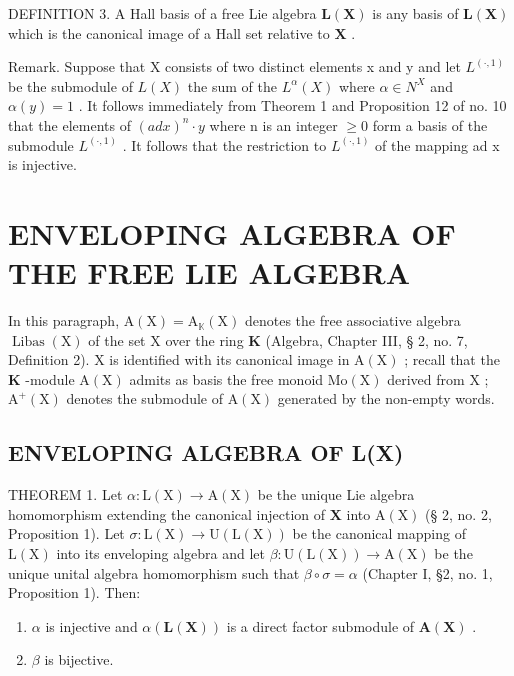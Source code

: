 DEFINITION 3. A Hall basis of a free Lie algebra \(\mathbf{L}(\mathbf{X})\) is any basis of \(\mathbf{L}(\mathbf{X})\) which is the canonical image of a Hall set relative to \(\mathbf{X}\) .

Remark. Suppose that X consists of two distinct elements x and y and let \(L^{(\cdot,1)}\) be the submodule of \(L(X)\) the sum of the \(L^{\alpha}(X)\) where \(\alpha\in N^{X}\) and \(\alpha(y)=1\) . It follows immediately from Theorem 1 and Proposition 12 of no. 10 that the elements of \((ad x)^{n}\cdot y\) where n is an integer \(\geqslant0\) form a basis of the submodule \(L^{(\cdot,1)}\) . It follows that the restriction to \(L^{(\cdot,1)}\) of the mapping ad x is injective.

\section{ENVELOPING ALGEBRA OF THE FREE LIE ALGEBRA}

In this paragraph, \(\mathrm{A}(\mathrm{X}) = \mathrm{A}_{\mathbb{K}}(\mathrm{X})\) denotes the free associative algebra \(\operatorname{Libas}(\mathrm{X})\) of the set \(\mathrm{X}\) over the ring \(\mathbf{K}\) (Algebra, Chapter III, § 2, no. 7, Definition 2). \(\mathrm{X}\) is identified with its canonical image in \(\mathrm{A}(\mathrm{X})\) ; recall that the \(\mathbf{K}\) -module \(\mathrm{A}(\mathrm{X})\) admits as basis the free monoid \(\mathrm{Mo}(\mathrm{X})\) derived from \(\mathrm{X}\) ; \(\mathrm{A}^{+}(\mathrm{X})\) denotes the submodule of \(\mathrm{A}(\mathrm{X})\) generated by the non-empty words.

\subsection{ENVELOPING ALGEBRA OF L(X)}

THEOREM 1. Let \(\alpha: \mathrm{L}(\mathrm{X}) \to \mathrm{A}(\mathrm{X})\) be the unique Lie algebra homomorphism extending the canonical injection of \(\mathbf{X}\) into \(\mathrm{A}(\mathrm{X})\) (§ 2, no. 2, Proposition 1). Let \(\sigma \colon \mathrm{L}(\mathrm{X}) \to \mathrm{U}(\mathrm{L}(\mathrm{X}))\) be the canonical mapping of \(\mathrm{L}(\mathrm{X})\) into its enveloping algebra and let \(\beta \colon \mathrm{U}(\mathrm{L}(\mathrm{X})) \to \mathrm{A}(\mathrm{X})\) be the unique unital algebra homomorphism such that \(\beta \circ \sigma = \alpha\) (Chapter I, §2, no. 1, Proposition 1). Then:

\begin{enumerate}
\def\labelenumi{(\alph{enumi})}
\item
  \(\alpha\) is injective and \(\alpha(\mathbf{L}(\mathbf{X}))\) is a direct factor submodule of \(\mathbf{A}(\mathbf{X})\) .
\item
  \(\beta\) is bijective.
\end{enumerate}

